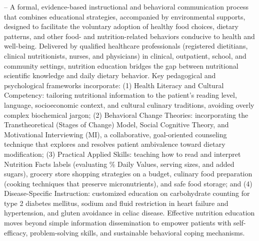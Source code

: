 -- A formal, evidence-based instructional and behavioral communication process that combines educational strategies, accompanied by environmental supports, designed to facilitate the voluntary adoption of healthy food choices, dietary patterns, and other food- and nutrition-related behaviors conducive to health and well-being. Delivered by qualified healthcare professionals (registered dietitians, clinical nutritionists, nurses, and physicians) in clinical, outpatient, school, and community settings, nutrition education bridges the gap between nutritional scientific knowledge and daily dietary behavior. Key pedagogical and psychological frameworks incorporate: (1) Health Literacy and Cultural Competency: tailoring nutritional information to the patient's reading level, language, socioeconomic context, and cultural culinary traditions, avoiding overly complex biochemical jargon; (2) Behavioral Change Theories: incorporating the Transtheoretical (Stages of Change) Model, Social Cognitive Theory, and Motivational Interviewing (MI), a collaborative, goal-oriented counseling technique that explores and resolves patient ambivalence toward dietary modification; (3) Practical Applied Skills: teaching how to read and interpret Nutrition Facts labels (evaluating \% Daily Values, serving sizes, and added sugars), grocery store shopping strategies on a budget, culinary food preparation (cooking techniques that preserve micronutrients), and safe food storage; and (4) Disease-Specific Instruction: customized education on carbohydrate counting for type 2 diabetes mellitus, sodium and fluid restriction in heart failure and hypertension, and gluten avoidance in celiac disease. Effective nutrition education moves beyond simple information dissemination to empower patients with self-efficacy, problem-solving skills, and sustainable behavioral coping mechanisms.

